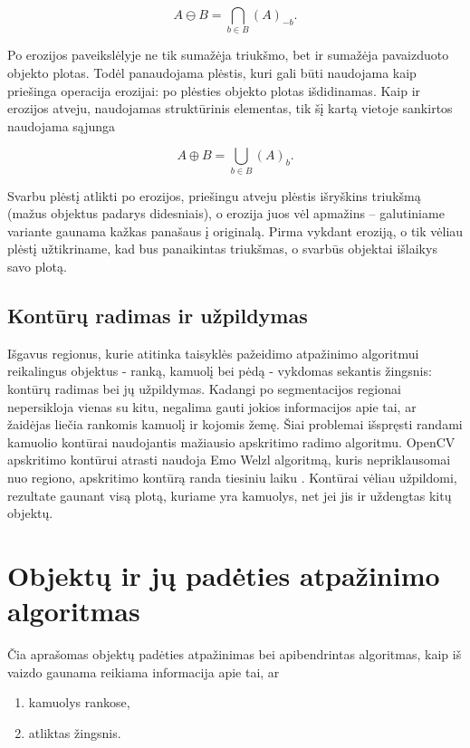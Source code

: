 \documentclass{VUMIFPSkursinis}
\begin{document}
\begin{equation}\label{eq:erozija}
A \ominus B = \bigcap_ {b \in B } (A)_{-b} .
\end{equation}

Po erozijos paveikslėlyje ne tik sumažėja triukšmo, bet ir sumažėja pavaizduoto objekto plotas. Todėl panaudojama plėstis, kuri gali būti naudojama kaip priešinga operacija erozijai: po plėsties objekto plotas išdidinamas. Kaip ir erozijos atveju, naudojamas struktūrinis elementas, tik šį kartą vietoje sankirtos naudojama sąjunga \cite{ImageAnalysisMorph}

\begin{equation}\label{eq:plestis}
A \oplus B = \bigcup_ {b \in B } (A)_{b} .
\end{equation}

Svarbu plėstį atlikti po erozijos, priešingu atveju plėstis išryškins triukšmą (mažus objektus padarys didesniais), o erozija juos vėl apmažins – galutiniame variante gaunama kažkas panašaus į originalą. Pirma vykdant eroziją, o tik vėliau plėstį užtikriname, kad bus panaikintas triukšmas, o svarbūs objektai išlaikys savo plotą. 

\subsection{Kontūrų radimas ir užpildymas}
Išgavus regionus, kurie atitinka taisyklės pažeidimo atpažinimo algoritmui reikalingus objektus - ranką, kamuolį bei pėdą - vykdomas sekantis žingsnis: kontūrų radimas bei jų užpildymas. Kadangi po segmentacijos regionai nepersikloja vienas su kitu, negalima gauti jokios informacijos apie tai, ar žaidėjas liečia rankomis kamuolį ir kojomis žemę. Šiai problemai išspręsti randami kamuolio kontūrai naudojantis mažiausio apskritimo radimo algoritmu. OpenCV apskritimo kontūrui atrasti naudoja Emo Welzl algoritmą, kuris nepriklausomai nuo regiono, apskritimo kontūrą randa tiesiniu laiku \cite{smallestenclosing}. Kontūrai vėliau užpildomi, rezultate gaunant visą plotą, kuriame yra kamuolys, net jei jis ir uždengtas kitų objektų.

\section{Objektų ir jų padėties atpažinimo algoritmas}
Čia aprašomas objektų padėties atpažinimas bei apibendrintas algoritmas, kaip iš vaizdo gaunama reikiama informacija apie tai, ar 
\begin{enumerate}
	\item kamuolys rankose, 
	\item atliktas žingsnis.
\end{enumerate}
\end{document}
